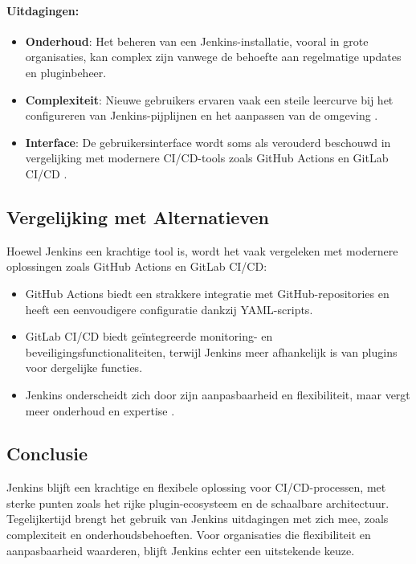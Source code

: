 \paragraph{Uitdagingen:}
\begin{itemize}
    \item \textbf{Onderhoud}: Het beheren van een Jenkins-installatie, vooral in grote organisaties, kan complex zijn vanwege de behoefte aan regelmatige updates en pluginbeheer.
    \item \textbf{Complexiteit}: Nieuwe gebruikers ervaren vaak een steile leercurve bij het configureren van Jenkins-pijplijnen en het aanpassen van de omgeving \autocite{springer2023ci}.
    \item \textbf{Interface}: De gebruikersinterface wordt soms als verouderd beschouwd in vergelijking met modernere CI/CD-tools zoals GitHub Actions en GitLab CI/CD \autocite{springer2023ci}.
\end{itemize}

\subsection{Vergelijking met Alternatieven}

Hoewel Jenkins een krachtige tool is, wordt het vaak vergeleken met modernere oplossingen zoals GitHub Actions en GitLab CI/CD:
\begin{itemize}
    \item GitHub Actions biedt een strakkere integratie met GitHub-repositories en heeft een eenvoudigere configuratie dankzij YAML-scripts.
    \item GitLab CI/CD biedt geïntegreerde monitoring- en beveiligingsfunctionaliteiten, terwijl Jenkins meer afhankelijk is van plugins voor dergelijke functies.
    \item Jenkins onderscheidt zich door zijn aanpasbaarheid en flexibiliteit, maar vergt meer onderhoud en expertise \autocite{shahin2017}.
\end{itemize}

\subsection{Conclusie}

Jenkins blijft een krachtige en flexibele oplossing voor CI/CD-processen, met sterke punten zoals het rijke plugin-ecosysteem en de schaalbare architectuur. Tegelijkertijd brengt het gebruik van Jenkins uitdagingen met zich mee, zoals complexiteit en onderhoudsbehoeften. Voor organisaties die flexibiliteit en aanpasbaarheid waarderen, blijft Jenkins echter een uitstekende keuze.


